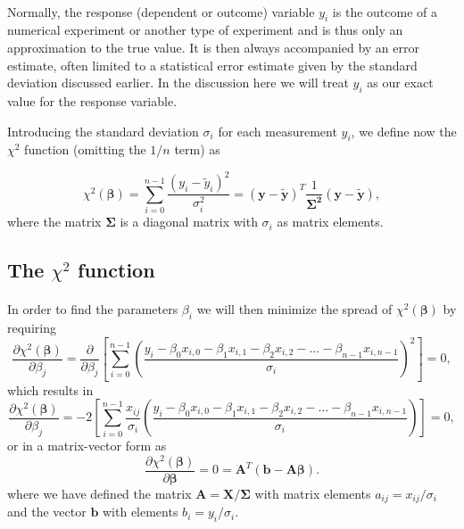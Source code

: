\documentclass[%
oneside,                 %
final,                   %
10pt]{article}
\begin{document}
\paragraph{}

Normally, the response (dependent or outcome) variable $y_i$ is the
outcome of a numerical experiment or another type of experiment and is
thus only an approximation to the true value. It is then always
accompanied by an error estimate, often limited to a statistical error
estimate given by the standard deviation discussed earlier. In the
discussion here we will treat $y_i$ as our exact value for the
response variable.

Introducing the standard deviation $\sigma_i$ for each measurement
$y_i$, we define now the $\chi^2$ function (omitting the $1/n$ term)
as

\[
\chi^2(\bm{\beta})=\sum_{i=0}^{n-1}\frac{\left(y_i-\tilde{y}_i\right)^2}{\sigma_i^2}=\left(\bm{y}-\bm{\tilde{y}}\right)^T\frac{1}{\bm{\Sigma^2}}\left(\bm{y}-\bm{\tilde{y}}\right),
\]
where the matrix $\bm{\Sigma}$ is a diagonal matrix with $\sigma_i$ as matrix elements.



\subsection{The $\chi^2$ function}

\paragraph{}

In order to find the parameters $\beta_i$ we will then minimize the spread of $\chi^2(\bm{\beta})$ by requiring
\[
\frac{\partial \chi^2(\bm{\beta})}{\partial \beta_j} = \frac{\partial }{\partial \beta_j}\left[ \sum_{i=0}^{n-1}\left(\frac{y_i-\beta_0x_{i,0}-\beta_1x_{i,1}-\beta_2x_{i,2}-\dots-\beta_{n-1}x_{i,n-1}}{\sigma_i}\right)^2\right]=0, 
\]
which results in
\[
\frac{\partial \chi^2(\bm{\beta})}{\partial \beta_j} = -2\left[ \sum_{i=0}^{n-1}\frac{x_{ij}}{\sigma_i}\left(\frac{y_i-\beta_0x_{i,0}-\beta_1x_{i,1}-\beta_2x_{i,2}-\dots-\beta_{n-1}x_{i,n-1}}{\sigma_i}\right)\right]=0, 
\]
or in a matrix-vector form as
\[
\frac{\partial \chi^2(\bm{\beta})}{\partial \bm{\beta}} = 0 = \bm{A}^T\left( \bm{b}-\bm{A}\bm{\beta}\right).  
\]
where we have defined the matrix $\bm{A} =\bm{X}/\bm{\Sigma}$ with matrix elements $a_{ij} = x_{ij}/\sigma_i$ and the vector $\bm{b}$ with elements $b_i = y_i/\sigma_i$.
\end{document}
